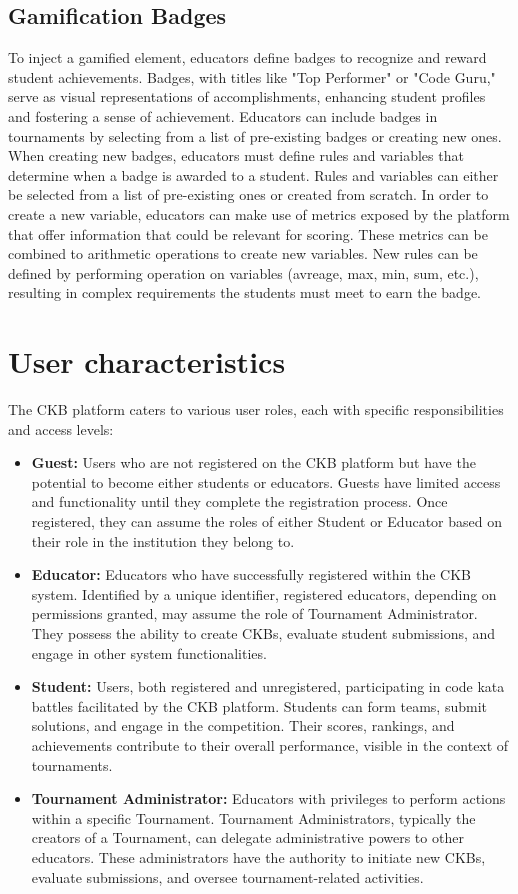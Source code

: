 \subsection*{Gamification Badges}
To inject a gamified element, educators define badges to recognize and reward student achievements. 
Badges, with titles like "Top Performer" or "Code Guru," serve as visual representations of accomplishments, enhancing student profiles and fostering a sense of achievement.
Educators can include badges in tournaments by selecting from a list of pre-existing badges or creating new ones.
When creating new badges, educators must define rules and variables that determine when a badge is awarded to a student.
Rules and variables can either be selected from a list of pre-existing ones or created from scratch.
In order to create a new variable, educators can make use of metrics exposed by the platform that offer information that could be relevant for scoring. 
These metrics can be combined to arithmetic operations to create new variables.
New rules can be defined by performing operation on variables (avreage, max, min, sum, etc.), resulting in complex requirements the students must meet to earn the badge.



\section{User characteristics}
\label{sec:user_characteristics}%
The CKB platform caters to various user roles, each with specific responsibilities and access levels:
\begin{itemize}
    \item \textbf{Guest:}  Users who are not registered on the CKB platform but have the potential to become either students or educators. 
    Guests have limited access and functionality until they complete the registration process. 
    Once registered, they can assume the roles of either Student or Educator based on their role in the institution they belong to.
    \item \textbf{Educator:} Educators who have successfully registered within the CKB system. Identified by a unique identifier, registered educators, depending on permissions granted, may assume the role of Tournament Administrator. 
    They possess the ability to create CKBs, evaluate student submissions, and engage in other system functionalities.
    \item \textbf{Student:} Users, both registered and unregistered, participating in code kata battles facilitated by the CKB platform. 
    Students can form teams, submit solutions, and engage in the competition. 
    Their scores, rankings, and achievements contribute to their overall performance, visible in the context of tournaments.
    \item \textbf{Tournament Administrator:} Educators with privileges to perform actions within a specific Tournament. Tournament Administrators, typically the creators of a Tournament, can delegate administrative powers to other educators. 
    These administrators have the authority to initiate new CKBs, evaluate submissions, and oversee tournament-related activities.
\end{itemize}

